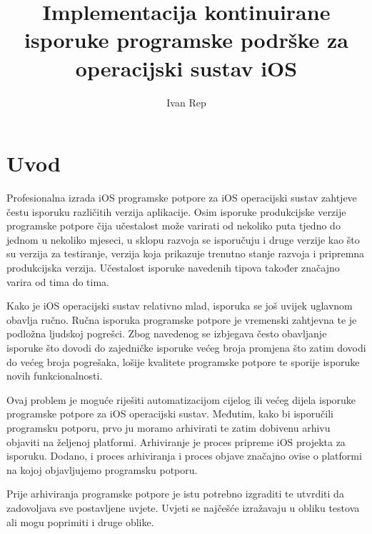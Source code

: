 \documentclass[times, utf8, diplomski, numeric]{fer}
\begin{document}

\title{Implementacija kontinuirane isporuke programske podrške za operacijski sustav iOS}

\author{Ivan Rep}

\maketitle

\izvornik

\zahvala{}

\tableofcontents

\chapter{Uvod}

Profesionalna izrada iOS programske potpore za iOS operacijski sustav zahtjeve čestu isporuku različitih verzija aplikacije. Osim isporuke produkcijske verzije programske potpore čija učestalost može varirati od nekoliko puta tjedno do jednom u nekoliko mjeseci, u sklopu razvoja se isporučuju i druge verzije kao što su verzija za testiranje, verzija koja prikazuje trenutno stanje razvoja i pripremna produkcijska verzija. Učestalost isporuke navedenih tipova također značajno varira od tima do tima.

Kako je iOS operacijski sustav relativno mlad, isporuka se još uvijek uglavnom obavlja ručno. Ručna isporuka programske potpore je vremenski zahtjevna te je podložna ljudskoj pogrešci. Zbog navedenog se izbjegava često obavljanje isporuke što dovodi do zajedničke isporuke većeg broja promjena što zatim dovodi do većeg broja pogrešaka, lošije kvalitete programske potpore te sporije isporuke novih funkcionalnosti.

Ovaj problem je moguće riješiti automatizacijom cijelog ili većeg dijela isporuke programske potpore za iOS operacijski sustav. Međutim, kako bi isporučili programsku potporu, prvo ju moramo arhivirati te zatim dobivenu arhivu objaviti na željenoj platformi. Arhiviranje je proces pripreme iOS projekta za isporuku. Dodano, i proces arhiviranja i proces objave značajno ovise o platformi na kojoj objavljujemo programsku potporu.

Prije arhiviranja programske potpore je istu potrebno izgraditi te utvrditi da zadovoljava sve postavljene uvjete. Uvjeti se najčešće izražavaju u obliku testova ali mogu poprimiti i druge oblike.
\end{document}
